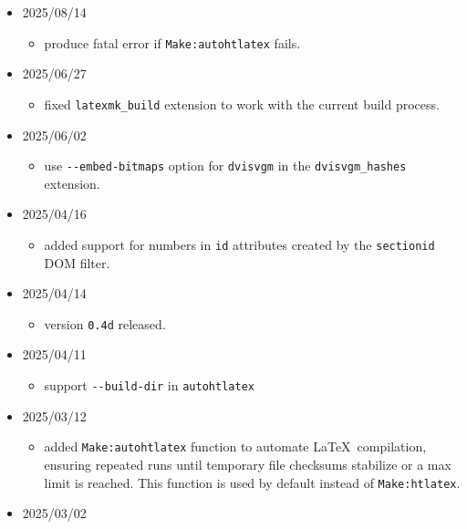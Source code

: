 \begin{itemize}
  \begin{itemize}
  \tightlist
  \item
    added support for the MathML \texttt{intent} and \texttt{arg}
    attributes in the \texttt{mathml-fixes} DOM filter.
  \end{itemize}
\item
  2025/08/14

  \begin{itemize}
  \tightlist
  \item
    produce fatal error if \texttt{Make:autohtlatex} fails.
  \end{itemize}
\item
  2025/06/27

  \begin{itemize}
  \tightlist
  \item
    fixed \texttt{latexmk\_build} extension to work with the current
    build process.
  \end{itemize}
\item
  2025/06/02

  \begin{itemize}
  \tightlist
  \item
    use \texttt{-\/-embed-bitmaps} option for \texttt{dvisvgm} in the
    \texttt{dvisvgm\_hashes} extension.
  \end{itemize}
\item
  2025/04/16

  \begin{itemize}
  \tightlist
  \item
    added support for numbers in \texttt{id} attributes created by the
    \texttt{sectionid} DOM filter.
  \end{itemize}
\item
  2025/04/14

  \begin{itemize}
  \tightlist
  \item
    version \texttt{0.4d} released.
  \end{itemize}
\item
  2025/04/11

  \begin{itemize}
  \tightlist
  \item
    support \texttt{-\/-build-dir} in \texttt{autohtlatex}
  \end{itemize}
\item
  2025/03/12

  \begin{itemize}
  \tightlist
  \item
    added \texttt{Make:autohtlatex} function to automate
    \LaTeX~compilation, ensuring repeated runs until temporary file
    checksums stabilize or a max limit is reached. This function is used
    by default instead of \texttt{Make:htlatex}.
  \end{itemize}
\item
  2025/03/02


\end{itemize}
